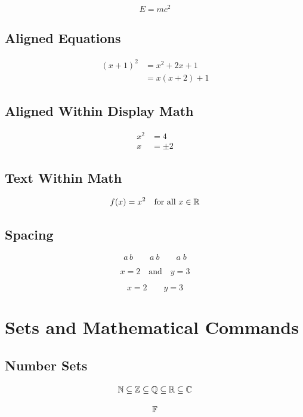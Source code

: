 \documentclass{article}
\begin{document}
\begin{equation*}
    E=mc^2
\end{equation*}

\subsection{Aligned Equations}

\begin{align*}
    (x+1)^2 &= x^2+2x+1 \\
            &= x(x+2)+1
\end{align*}

\subsection{Aligned Within Display Math}

\[
\begin{aligned}
    x^2 &= 4 \\
    x &= \pm 2
\end{aligned}
\]

\subsection{Text Within Math}

\[
    f(x)=x^2
    \quad \text{for all } x\in\mathbb{R}
\]

\subsection{Spacing}

\[
    a\,b
    \qquad
    a\:b
    \qquad
    a\;b
\]

\[
    x=2 \quad \text{and} \quad y=3
\]

\[
    x=2 \qquad y=3
\]


\section{Sets and Mathematical Commands}

\subsection{Number Sets}

\[
    \mathbb{N}\subseteq\mathbb{Z}\subseteq\mathbb{Q}\subseteq\mathbb{R}\subseteq\mathbb{C}
\]

\[
    \mathbb{F}
\]
\end{document}
